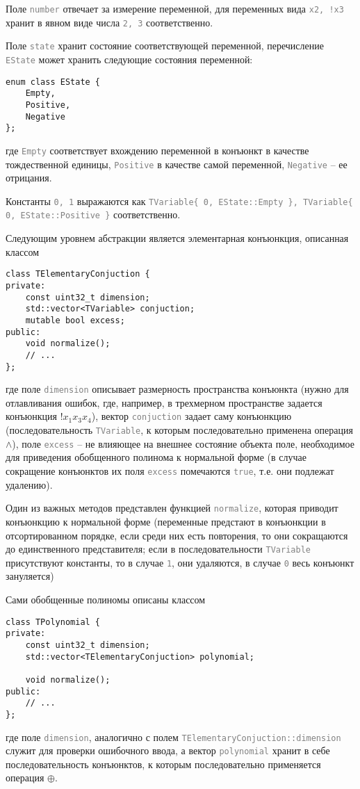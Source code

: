 \documentclass[a4paper,12pt,titlepage,finall]{article}
\newcommand{\code}[1]{\textcolor{gray}{\texttt{#1}}}
\begin{document}
Поле \code{number} отвечает за измерение переменной, для переменных вида \code{x2, !x3} хранит в явном виде числа \code{2, 3} соответственно.

Поле \code{state} хранит состояние соответствующей переменной, перечисление \code{EState} может хранить следующие состояния переменной:
\begin{lstlisting}
enum class EState {
    Empty,
    Positive,
    Negative
};
\end{lstlisting}
где \code{Empty} соответствует вхождению переменной в конъюнкт в качестве тождественной единицы, \code{Positive} в качестве самой переменной, \code{Negative} -- ее отрицания.

Константы \code{0, 1} выражаются как \code{TVariable\{ 0, EState::Empty \}, TVariable\{ 0, EState::Positive \}} соответственно.

Следующим уровнем абстракции является элементарная конъюнкция, описанная классом
\begin{lstlisting}
class TElementaryConjuction {
private:
    const uint32_t dimension;
    std::vector<TVariable> conjuction;
    mutable bool excess;
public:
    void normalize();
    // ...
};
\end{lstlisting}
где поле \code{dimension} описывает размерность пространства конъюнкта (нужно для отлавливания ошибок, где, например, в трехмерном пространстве задается конъюнкция $!x_1x_3x_4$), вектор \code{conjuction} задает саму конъюнкцию (последовательность \code{TVariable}, к которым последовательно применена операция $\land$), поле \code{excess} -- не влияющее на внешнее состояние объекта поле, необходимое для приведения обобщенного полинома к нормальной форме (в случае сокращение конъюнктов их поля \code{excess} помечаются \code{true}, т.е. они подлежат удалению).

Один из важных методов представлен функцией \code{normalize}, которая приводит конъюнкцию к нормальной форме (переменные предстают в конъюнкции в отсортированном порядке, если среди них есть повторения, то они сокращаются до единственного представителя; если в последовательности \code{TVariable} присутствуют константы, то в случае \code{1}, они удаляются, в случае \code{0} весь конъюнкт зануляется)

Сами обобщенные полиномы описаны классом
\begin{lstlisting}
class TPolynomial {
private:
    const uint32_t dimension;
    std::vector<TElementaryConjuction> polynomial;

    void normalize();
public:
    // ...
};
\end{lstlisting}
где поле \code{dimension}, аналогично с полем \code{TElementaryConjuction::dimension} служит для проверки ошибочного ввода, а вектор \code{polynomial} хранит в себе последовательность конъюнктов, к которым последовательно применяется операция $\oplus$.
\end{document}
